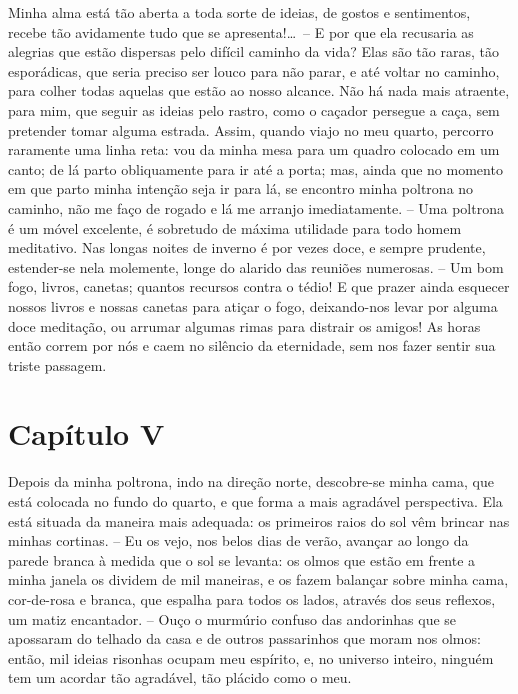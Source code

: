  Minha alma está tão aberta a toda sorte de ideias, de gostos e
sentimentos, recebe tão avidamente tudo que se apresenta!\ldots\ -- E por
que ela recusaria as alegrias que estão dispersas pelo difícil caminho
da vida? Elas são tão raras, tão esporádicas, que seria preciso ser
louco para não parar, e até voltar no caminho, para colher todas
aquelas que estão ao nosso alcance. Não há nada mais atraente, para
mim, que seguir as ideias pelo rastro, como o caçador persegue a caça,
sem pretender tomar alguma estrada. Assim, quando viajo no meu quarto,
percorro raramente uma linha reta: vou da minha mesa para um quadro
colocado em um canto; de lá parto obliquamente para ir até a porta;
mas, ainda que no momento em que parto minha intenção seja ir para lá,
se encontro minha poltrona no caminho, não me faço de rogado e lá me
arranjo imediatamente. -- Uma poltrona é um móvel excelente, é
sobretudo de máxima utilidade para todo homem meditativo. Nas longas
noites de inverno é por vezes doce, e sempre prudente, estender-se nela
molemente, longe do alarido das reuniões numerosas. -- Um bom fogo,
livros, canetas; quantos recursos contra o tédio! E que prazer ainda
esquecer nossos livros e nossas canetas para atiçar o fogo,
deixando-nos levar por alguma doce meditação, ou arrumar algumas rimas
para distrair os amigos! As horas então correm por nós e caem no
silêncio da eternidade, sem nos fazer sentir sua triste passagem. 

\section*{Capítulo V}

 Depois da minha poltrona, indo na direção norte, descobre-se minha
cama, que está colocada no fundo do quarto, e que forma a mais
agradável perspectiva. Ela está situada da maneira mais adequada: os
primeiros raios do sol vêm brincar nas minhas cortinas. -- Eu os vejo,
nos belos dias de verão, avançar ao longo da parede branca à medida que
o sol se levanta: os olmos que estão em frente a minha janela os
dividem de mil maneiras, e os fazem balançar sobre minha cama,
cor-de-rosa e branca, que espalha para todos os lados, através dos seus
reflexos, um matiz encantador. -- Ouço o murmúrio confuso das
andorinhas que se apossaram do telhado da casa e de outros passarinhos
que moram nos olmos: então, mil ideias risonhas ocupam meu espírito, e,
no universo inteiro, ninguém tem um acordar tão agradável, tão plácido
como o meu.

